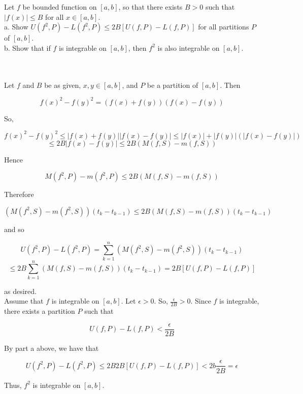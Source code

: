 Let $f$ be bounded function on $[a,b]$, so that there exists $B>0$ such that $|f(x)|\leq B$ for all
$x\in[a,b]$.\\

a. Show $U(f^2,P)-L(f^2,P)\leq2B[U(f,P)-L(f,P)]$ for all partitions $P$ of $[a,b]$.\\

b. Show that if $f$ is integrable on $[a,b]$, then $f^2$ is also integrable on $[a,b]$.\\\\

\begin{solution}\renewcommand{\qedsymbol}{}\ \\
    Let $f$ and $B$ be as given, $x,y\in[a,b]$, and $P$ be a partition of $[a,b]$. Then
    
    $$f(x)^2-f(y)^2=(f(x)+f(y))(f(x)-f(y))$$
    
    So,
    
    $$f(x)^2-f(y)^2\leq|f(x)+f(y)||f(x)-f(y)|\leq|f(x)|+|f(y)|(|f(x)-f(y)|)$$
    $$\leq2B|f(x)-f(y)|\leq2B(M(f,S)-m(f,S))$$
    
    Hence
    
    $$M(f^2,P)-m(f^2,P)\leq 2B(M(f,S)-m(f,S))$$
    
    Therefore
    
    $$(M(f^2,S)-m(f^2,S))(t_k-t_{k-1})\leq2B(M(f,S)-m(f,S))(t_k-t_{k-1})$$
    
    and so
    
    $$U(f^2,P)-L(f^2,P)=\sum_{k=1}^n(M(f^2,S)-m(f^2,S))(t_k-t_{k-1})$$
    $$\leq2B\sum_{k=1}^n(M(f,S)-m(f,S))(t_k-t_{k-1})=2B[U(f,P)-L(f,P)]$$
    
    as desired.\\

    Assume that $f$ is integrable on $[a,b]$. Let $\epsilon>0$. So, $\frac{\epsilon}{2B}>0$. Since $f$
    is integrable, there exists a partition $P$ such that
    
    $$U(f,P)-L(f,P)<\frac{\epsilon}{2B}$$
    
    By part a above, we have that
    
    $$U(f^2,P)-L(f^2,P)\leq2B2B[U(f,P)-L(f,P)]<2b\frac{\epsilon}{2B}=\epsilon$$
    
    Thus, $f^2$ is integrable on $[a,b]$.

\end{solution}